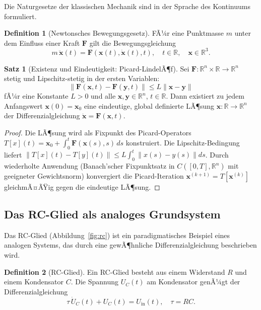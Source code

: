 ﻿\documentclass[a4paper,12pt]{article}
\theoremstyle{definition}
\newtheorem{definition}{Definition}
\newtheorem{satz}{Satz}
\begin{document}
Die Naturgesetze der klassischen Mechanik sind in der Sprache des Kontinuums formuliert.

\begin{definition}[Newtonsches Bewegungsgesetz]
FÃ¼r eine Punktmasse $m$ unter dem Einfluss einer Kraft $\mathbf{F}$ gilt die
Bewegungsgleichung
\[
m\, \ddot{\mathbf{x}}(t) = \mathbf{F}(\mathbf{x}(t), \dot{\mathbf{x}}(t), t),
\quad t \in \mathbb{R}, \quad \mathbf{x} \in \mathbb{R}^3.
\]
\end{definition}

\begin{satz}[Existenz und Eindeutigkeit: Picard-LindelÃ¶f]
\label{satz:picard}
Sei $\mathbf{F}: \mathbb{R}^n \times \mathbb{R} \to \mathbb{R}^n$ stetig und
Lipschitz-stetig in der ersten Variablen:
\[
\|\mathbf{F}(\mathbf{x},t) - \mathbf{F}(\mathbf{y},t)\| \leq L \|\mathbf{x}-\mathbf{y}\|
\]
fÃ¼r eine Konstante $L > 0$ und alle $\mathbf{x}, \mathbf{y} \in \mathbb{R}^n$, $t \in \mathbb{R}$.
Dann existiert zu jedem Anfangswert $\mathbf{x}(0) = \mathbf{x}_0$ eine eindeutige,
global definierte LÃ¶sung $\mathbf{x}: \mathbb{R} \to \mathbb{R}^n$ der
Differenzialgleichung $\dot{\mathbf{x}} = \mathbf{F}(\mathbf{x},t)$.
\end{satz}

\begin{proof}
Die LÃ¶sung wird als Fixpunkt des Picard-Operators
$T[x](t) = \mathbf{x}_0 + \int_0^t \mathbf{F}(\mathbf{x}(s), s) \, ds$
konstruiert.  Die Lipschitz-Bedingung liefert
$\|T[x](t) - T[y](t)\| \leq L\int_0^t \|x(s)-y(s)\| ds$.
Durch wiederholte Anwendung (Banach'scher Fixpunktsatz in $C([0,T],\mathbb{R}^n)$
mit geeigneter Gewichtsnorm) konvergiert die Picard-Iteration
$\mathbf{x}^{(k+1)} = T[\mathbf{x}^{(k)}]$ gleichmÃ¤ÃŸig gegen die eindeutige LÃ¶sung.
\end{proof}

\subsection{Das RC-Glied als analoges Grundsystem}

Das RC-Glied (Abbildung~\ref{fig:rc}) ist ein paradigmatisches Beispiel eines
analogen Systems, das durch eine gewÃ¶hnliche Differenzialgleichung beschrieben wird.

\begin{definition}[RC-Glied]
Ein RC-Glied besteht aus einem Widerstand $R$ und einem Kondensator $C$.
Die Spannung $U_C(t)$ am Kondensator genÃ¼gt der Differenzialgleichung
\[
\tau \, \dot{U}_C(t) + U_C(t) = U_{\mathrm{in}}(t), \quad \tau = RC.
\]
\end{definition}
\end{document}
